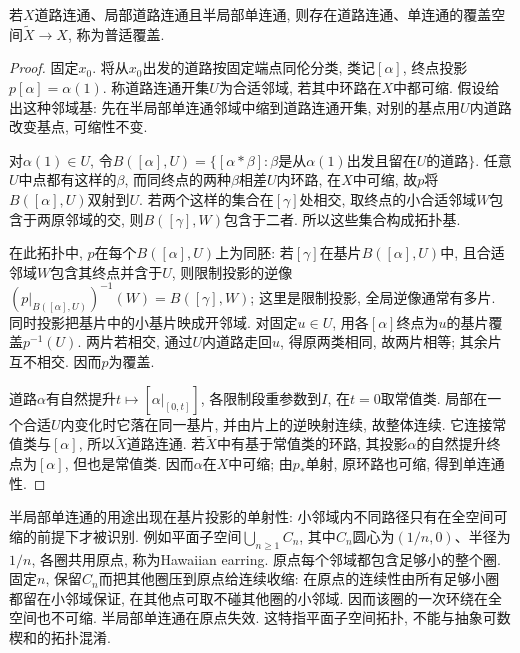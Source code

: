 \begin{theorem}\label{thm:universal-cover}
若$X$道路连通、局部道路连通且半局部单连通, 则存在道路连通、单连通的覆盖空间$\widetilde X\to X$, 称为普适覆盖.
\end{theorem}
\begin{proof}
固定$x_0$. 将从$x_0$出发的道路按固定端点同伦分类, 类记$[\alpha]$, 终点投影$p[\alpha]=\alpha(1)$. 称道路连通开集$U$为合适邻域, 若其中环路在$X$中都可缩. 假设给出这种邻域基: 先在半局部单连通邻域中缩到道路连通开集, 对别的基点用$U$内道路改变基点, 可缩性不变.

对$\alpha(1)\in U$, 令$B([\alpha],U)=\{[\alpha*\beta]:\beta\text{是从}\alpha(1)\text{出发且留在}U\text{的道路}\}$. 任意$U$中点都有这样的$\beta$, 而同终点的两种$\beta$相差$U$内环路, 在$X$中可缩, 故$p$将$B([\alpha],U)$双射到$U$. 若两个这样的集合在$[\gamma]$处相交, 取终点的小合适邻域$W$包含于两原邻域的交, 则$B([\gamma],W)$包含于二者. 所以这些集合构成拓扑基.

在此拓扑中, $p$在每个$B([\alpha],U)$上为同胚: 若$[\gamma]$在基片$B([\alpha],U)$中, 且合适邻域$W$包含其终点并含于$U$, 则限制投影的逆像$(p|_{B([\alpha],U)})^{-1}(W)=B([\gamma],W)$; 这里是限制投影, 全局逆像通常有多片. 同时投影把基片中的小基片映成开邻域. 对固定$u\in U$, 用各$[\alpha]$终点为$u$的基片覆盖$p^{-1}(U)$. 两片若相交, 通过$U$内道路走回$u$, 得原两类相同, 故两片相等; 其余片互不相交. 因而$p$为覆盖.

道路$\alpha$有自然提升$t\mapsto[\alpha|_{[0,t]}]$, 各限制段重参数到$I$, 在$t=0$取常值类. 局部在一个合适$U$内变化时它落在同一基片, 并由片上的逆映射连续, 故整体连续. 它连接常值类与$[\alpha]$, 所以$\widetilde X$道路连通. 若$\widetilde X$中有基于常值类的环路, 其投影$\alpha$的自然提升终点为$[\alpha]$, 但也是常值类. 因而$\alpha$在$X$中可缩; 由$p_*$单射, 原环路也可缩, 得到单连通性.
\end{proof}
半局部单连通的用途出现在基片投影的单射性: 小邻域内不同路径只有在全空间可缩的前提下才被识别. 例如平面子空间$\bigcup_{n\ge1}C_n$, 其中$C_n$圆心为$(1/n,0)$、半径为$1/n$, 各圈共用原点, 称为Hawaiian earring. 原点每个邻域都包含足够小的整个圈. 固定$n$, 保留$C_n$而把其他圈压到原点给连续收缩: 在原点的连续性由所有足够小圈都留在小邻域保证, 在其他点可取不碰其他圈的小邻域. 因而该圈的一次环绕在全空间也不可缩. 半局部单连通在原点失效. 这特指平面子空间拓扑, 不能与抽象可数楔和的拓扑混淆.

